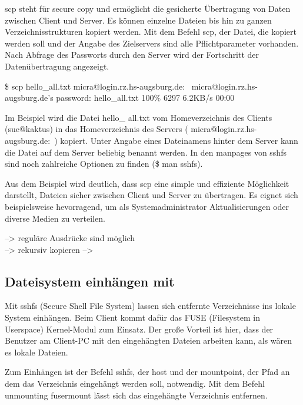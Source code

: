 \documentclass[ngerman,pdf]{wkcms}    %
\begin{document}
\IT scp steht für \IT secure \IT copy und ermöglicht die gesicherte Übertragung von Daten zwischen Client und Server. Es können einzelne Dateien bis hin zu ganzen Verzeichnisstrukturen kopiert werden. \cite[S. 80]{openssh_book} Mit dem Befehl \IT scp, der Datei, die kopiert werden soll und der Angabe des Zielservers sind alle Pflichtparameter vorhanden. Nach Abfrage des Passworts durch den Server wird der Fortschritt der Datenübertragung angezeigt.

\begin{program}
\$ scp hello\_all.txt
micra@login.rz.hs-augsburg.de:~
micra@login.rz.hs-augsburg.de's password:
hello\_all.txt        100\% 6297     6.2KB/s   00:00
\end{program}

Im Beispiel wird die Datei \IT hello\_ \IT all.txt vom Homeverzeichnis des Clients (sue@kaktus) in das Homeverzeichnis des Servers ( micra@login.rz.hs-augsburg.de:~) kopiert. Unter Angabe eines Dateinamens hinter dem Server kann die Datei auf dem Server beliebig benannt werden. In den manpages von sshfs sind noch zahlreiche Optionen zu finden (\$ man sshfs).

Aus dem Beispiel wird deutlich, dass \IT scp eine simple und effiziente Möglichkeit darstellt, Dateien sicher zwischen Client und Server zu übertragen. Es eignet sich beispielsweise hevorragend, um als Systemadministrator Aktualisierungen oder diverse Medien zu verteilen. \cite[S. 80]{openssh_book}

--> reguläre Ausdrücke sind möglich \\
--> rekursiv kopieren
--> 

\subsection{Dateisystem einhängen mit }

Mit \IT sshfs (\IT Secure \IT Shell \IT File \IT System) lassen sich entfernte Verzeichnisse ins lokale System einhängen. Beim Client kommt dafür das FUSE (Filesystem in Userspace) Kernel-Modul zum Einsatz. Der große Vorteil ist hier, dass der Benutzer am Client-PC mit den eingehängten Dateien arbeiten kann, als wären es lokale Dateien.

Zum Einhängen ist der Befehl \IT sshfs, der \IT host und der \IT mountpoint,
\Dh der Pfad an dem das Verzeichnis eingehängt werden soll, notwendig.
Mit dem Befehl \IT unmounting \IT fusermount lässt sich das eingehängte Verzeichnis entfernen.
\end{document}
